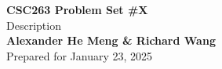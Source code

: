 \begin{titlepage}
    \null %
    \vfill
    \begin{center}
        {\fontsize{35}{48}\selectfont \bfseries CSC263 Problem Set \#X}
        \vspace{20pt} \\
        {\LARGE Description} \\
        \vspace{20pt}
        \textbf{Alexander He Meng \& Richard Wang}
        \vspace{8pt}
        \\ Prepared for January 23, 2025
    \end{center}
    \vfill
\end{titlepage}
